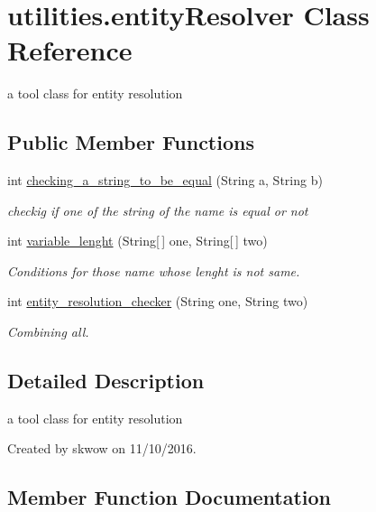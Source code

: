 \hypertarget{classutilities_1_1entity_resolver}{}\section{utilities.\+entity\+Resolver Class Reference}
\label{classutilities_1_1entity_resolver}


a tool class for entity resolution  


\subsection*{Public Member Functions}
\begin{DoxyCompactItemize}
\item 
int \hyperlink{classutilities_1_1entity_resolver_a3907a3b2ed45bcd052a354d949283350}{checking\+\_\+a\+\_\+string\+\_\+to\+\_\+be\+\_\+equal} (String a, String b)
\begin{DoxyCompactList}\small\item\em checkig if one of the string of the name is equal or not \end{DoxyCompactList}\item 
int \hyperlink{classutilities_1_1entity_resolver_a695716e282e5c008a3d72f13103f145e}{variable\+\_\+lenght} (String\mbox{[}$\,$\mbox{]} one, String\mbox{[}$\,$\mbox{]} two)
\begin{DoxyCompactList}\small\item\em Conditions for those name whose lenght is not same. \end{DoxyCompactList}\item 
int \hyperlink{classutilities_1_1entity_resolver_af9ca73ff07de65c6f70b958ab5569adf}{entity\+\_\+resolution\+\_\+checker} (String one, String two)
\begin{DoxyCompactList}\small\item\em Combining all. \end{DoxyCompactList}\end{DoxyCompactItemize}


\subsection{Detailed Description}
a tool class for entity resolution 

Created by skwow on 11/10/2016. 

\subsection{Member Function Documentation}
\hypertarget{classutilities_1_1entity_resolver_a3907a3b2ed45bcd052a354d949283350}{}\label{classutilities_1_1entity_resolver_a3907a3b2ed45bcd052a354d949283350} 
